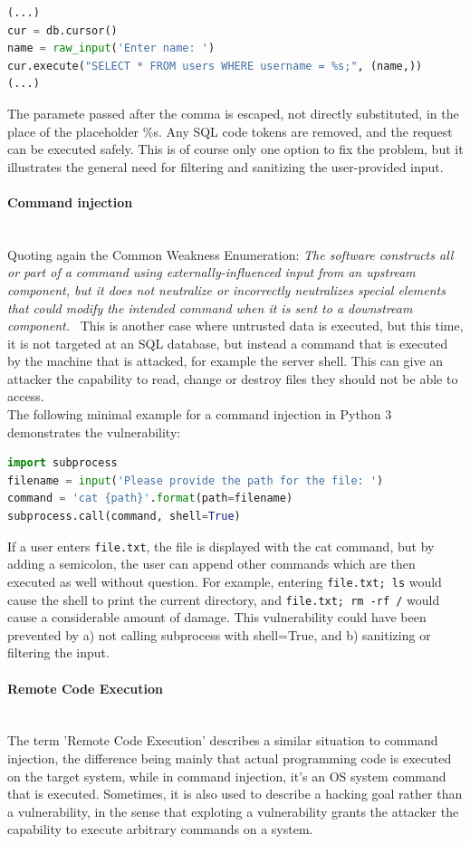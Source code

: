 \documentclass[
	a4paper,
	pagesize,
	pdftex,
	12pt,
	twoside, %
	BCOR=5mm, %
	ngerman,
	fleqn,
	final,
	]{scrartcl}
\begin{document}
\begin{lstlisting}[language=Python,showstringspaces=false]
(...)
cur = db.cursor()
name = raw_input('Enter name: ')
cur.execute("SELECT * FROM users WHERE username = %s;", (name,))
(...)
\end{lstlisting}
The paramete passed after the comma is escaped, not directly substituted, in the place of the placeholder \%s. Any SQL code tokens are removed, and the request can be executed safely. This is of course only one option to fix the problem, but it illustrates the general need for filtering and sanitizing the user-provided input. 

\paragraph{Command injection}\mbox{}\\
Quoting again the Common Weakness Enumeration: \textit{The software constructs all or part of a command using externally-influenced input from an upstream component, but it does not neutralize or incorrectly neutralizes special elements that could modify the intended command when it is sent to a downstream component.}~\cite{CommonWeaknessEnumeration.23.9.2019} This is another case where untrusted data is executed, but this time, it is not targeted at an SQL database, but instead a command that is executed by the machine that is attacked, for example the server shell. This can give an attacker the capability to read, change or destroy files they should not be able to access. \\
The following minimal example for a command injection in Python 3 demonstrates the vulnerability:
\begin{lstlisting}[language=Python,showstringspaces=false]
import subprocess
filename = input('Please provide the path for the file: ')
command = 'cat {path}'.format(path=filename)
subprocess.call(command, shell=True)
\end{lstlisting}
If a user enters \texttt{file.txt}, the file is displayed with the cat command, but by adding a semicolon, the user can append other commands which are then executed as well without question. For example, entering \texttt{file.txt; ls} would cause the shell to print the current directory, and \texttt{file.txt; rm -rf /} would cause a considerable amount of damage. This vulnerability could have been prevented by a) not calling subprocess with shell=True, and b) sanitizing or filtering the input. 

\paragraph{Remote Code Execution}\mbox{}\\
The term 'Remote Code Execution' describes a similar situation to command injection, the difference being mainly that actual programming code is executed on the target system, while in command injection, it's an OS system command that is executed. Sometimes, it is also used to describe a hacking goal rather than a vulnerability, in the sense that exploting a vulnerability grants the attacker the capability to execute arbitrary commands on a system. 
\end{document}
